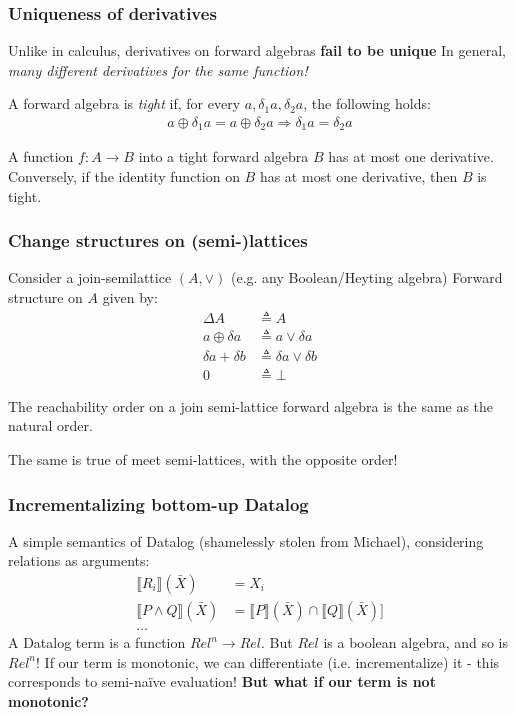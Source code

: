 \documentclass[english]{beamer}
\theoremstyle{plain}
\theoremstyle{remark}
\theoremstyle{remark}
\theoremstyle{remark}
\theoremstyle{definition}
\theoremstyle{definition}
\newcommand{\ra}[0]{\rightarrow}
\newcommand{\defeq}[0]{\triangleq}
\begin{document}
\begin{frame}
  \frametitle{Uniqueness of derivatives}
  Unlike in calculus, derivatives on forward algebras \textbf{fail to be unique}
  \vfill
  In general, \textit{many different derivatives for the same function!}
  \vfill
  \begin{definition}
    A forward algebra is \textit{tight} if, for every $a, \delta_1 a, \delta_2 a$, the following
    holds:
    \begin{align*}
      a \oplus \delta_1 a = a \oplus \delta_2 a \Rightarrow \delta_1 a = \delta_2 a
    \end{align*}
  \end{definition}

  \begin{lemma}
    A function $f : A \ra B$ into a tight forward algebra $B$ has at most one derivative.
    Conversely, if the identity function on $B$ has at most one derivative, then $B$ is tight.
  \end{lemma}

\end{frame}

\begin{frame}
  \frametitle{Change structures on (semi-)lattices}
  Consider a join-semilattice $(A, \vee)$ (e.g. any Boolean/Heyting algebra)
  \vfill
  Forward structure on $A$ given by:
  \begin{align*}
    \Delta A &\defeq A\\
    a \oplus \delta a &\defeq a \vee \delta a\\
    \delta a + \delta b &\defeq \delta a \vee \delta b\\
    0 &\defeq \bot
  \end{align*}
  \begin{lemma}
    The reachability order on a join semi-lattice forward algebra is the same as the
    natural order.
  \end{lemma}
  The same is true of meet semi-lattices, with the opposite order!
\end{frame}

\newcommand{\sem}[1]{\llbracket #1 \rrbracket}
\begin{frame}
  \frametitle{Incrementalizing bottom-up Datalog}
  A simple semantics of Datalog (shamelessly stolen from Michael), considering relations as
  arguments:
  \begin{align*}
    \sem{R_i}(\bar{X}) &= X_i\\
    \sem{P \wedge Q}(\bar{X}) &= \sem{P}(\bar{X}) \cap \sem{Q}(\bar{X})]\\
      \ldots
  \end{align*}
  A Datalog term is a function $\mathit{Rel}^n \ra \mathit{Rel}$.
  \vfill
  But $\mathit{Rel}$ is a boolean algebra, and so is $\mathit{Rel}^n$!
  \vfill
  If our term is monotonic, we can differentiate (i.e. incrementalize) it - this corresponds
  to semi-na\"ive evaluation!
  \vfill
  \textbf{But what if our term is not monotonic?}
\end{frame}
\end{document}

